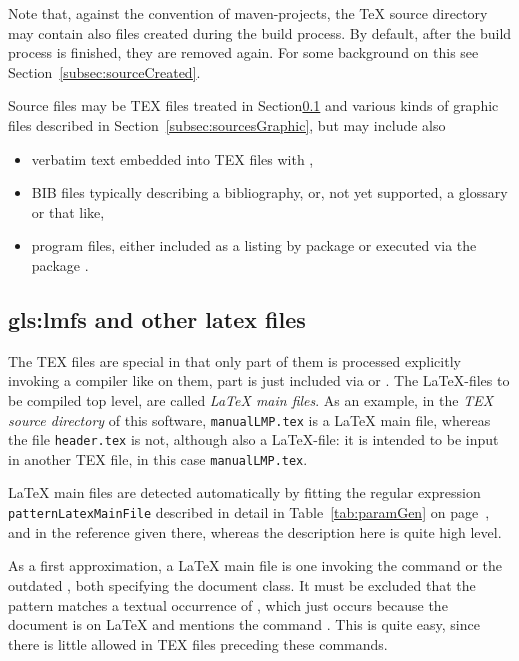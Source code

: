 Note that, against the convention of maven-projects, 
the \TeX{} source directory may contain also files created during the build process. 
By default, after the build process is finished, they are removed again. 
For some background on this see Section~\ref{subsec:sourceCreated}. 

Source files may be TEX files treated in Section\ref{subsec:sourcesLatex} 
and various kinds of graphic files described in Section~\ref{subsec:sourcesGraphic}, 
but may include also 
%
\begin{itemize}
\item 
verbatim text embedded into TEX files with , 
\item 
BIB files typically describing a bibliography,  or, %
not yet supported, a glossary or that like, %
\item 
program files, either included as a listing by package  
or executed via the package . %
\end{itemize}


\subsection{\texorpdfstring{\glspl{gls:lmf}}{LaTeX main files} and other latex files}
\label{subsec:sourcesLatex}

The TEX files are special in that only part of them is processed explicitly 
invoking a compiler like \lualatex{} on them, 
part is just included via  or . 
The \LaTeX-files to be compiled top level, 
are called \emph{\LaTeX{} main files}. 
As an example, 
in the \emph{TEX source directory} of this software, 
\texttt{manualLMP.tex} is a \LaTeX{} main file, 
whereas the file \texttt{header.tex} is not, although also a \LaTeX-file: 
it is intended to be input in another TEX file, in this case \texttt{manualLMP.tex}. 


\LaTeX{} main files are detected automatically 
by fitting the regular expression \texttt{patternLatexMainFile} 
described in detail in Table~\ref{tab:paramGen} on page~\pageref{tab:paramGen}, 
and in the reference given there, 
whereas the description here is quite high level. 

As a first approximation, a \LaTeX{} main file is one invoking 
the command  
or the outdated , both specifying the document class. 
It must be excluded that the pattern matches a textual occurrence of , 
which just occurs because the document is on \LaTeX{} 
and mentions the command . 
This is quite easy, since there is little allowed in TEX files preceding these commands. 

